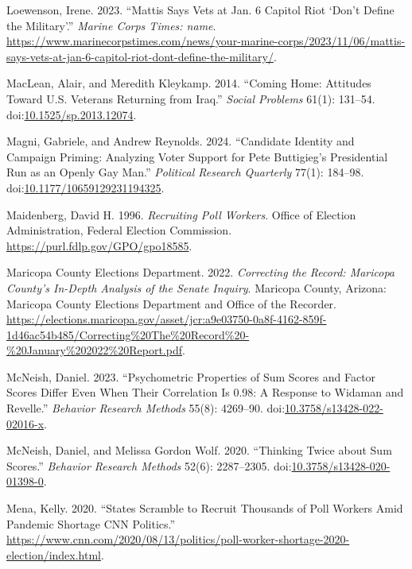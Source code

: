 \documentclass[
  12pt,
  letterpaper,
]{article}
\newlength{\cslhangindent}
\newenvironment{CSLReferences}[2] %
 {\begin{list}{}{%
  \setlength{\itemindent}{0pt}
  \setlength{\leftmargin}{0pt}
  \setlength{\parsep}{0pt}
  \ifodd #1
   \setlength{\leftmargin}{\cslhangindent}
   \setlength{\itemindent}{-1\cslhangindent}
  \fi
  \setlength{\itemsep}{#2\baselineskip}}}
 {\end{list}}
\begin{document}
\begin{CSLReferences}{1}{1}
Loewenson, Irene. 2023. {``Mattis Says Vets at {Jan}. 6 {Capitol} Riot
{`Don't Define the Military'}.''} \emph{Marine Corps Times: name}.
\url{https://www.marinecorpstimes.com/news/your-marine-corps/2023/11/06/mattis-says-vets-at-jan-6-capitol-riot-dont-define-the-military/}.

MacLean, Alair, and Meredith Kleykamp. 2014. {``Coming {Home}:
{Attitudes} Toward {U}.{S}. {Veterans Returning} from {Iraq}.''}
\emph{Social Problems} 61(1): 131--54.
doi:\href{https://doi.org/10.1525/sp.2013.12074}{10.1525/sp.2013.12074}.

Magni, Gabriele, and Andrew Reynolds. 2024. {``Candidate {Identity} and
{Campaign Priming}: {Analyzing Voter Support} for {Pete Buttigieg}'s
{Presidential Run} as an {Openly Gay Man}.''} \emph{Political Research
Quarterly} 77(1): 184--98.
doi:\href{https://doi.org/10.1177/10659129231194325}{10.1177/10659129231194325}.

Maidenberg, David H. 1996. \emph{Recruiting {Poll Workers}}. Office of
Election Administration, Federal Election Commission.
\url{https://purl.fdlp.gov/GPO/gpo18585}.

Maricopa County Elections Department. 2022. \emph{Correcting the
{Record}: {Maricopa County}'s {In-Depth Analysis} of the {Senate
Inquiry}}. Maricopa County, Arizona: {Maricopa County Elections
Department and Office of the Recorder}.
\url{https://elections.maricopa.gov/asset/jcr:a9e03750-0a8f-4162-859f-1d46ac54b485/Correcting\%20The\%20Record\%20-\%20January\%202022\%20Report.pdf}.

McNeish, Daniel. 2023. {``Psychometric Properties of Sum Scores and
Factor Scores Differ Even When Their Correlation Is 0.98: {A} Response
to {Widaman} and {Revelle}.''} \emph{Behavior Research Methods} 55(8):
4269--90.
doi:\href{https://doi.org/10.3758/s13428-022-02016-x}{10.3758/s13428-022-02016-x}.

McNeish, Daniel, and Melissa Gordon Wolf. 2020. {``Thinking Twice about
Sum Scores.''} \emph{Behavior Research Methods} 52(6): 2287--2305.
doi:\href{https://doi.org/10.3758/s13428-020-01398-0}{10.3758/s13428-020-01398-0}.

Mena, Kelly. 2020. {``States Scramble to Recruit Thousands of Poll
Workers Amid Pandemic Shortage \textbar{} {CNN Politics}.''}
\url{https://www.cnn.com/2020/08/13/politics/poll-worker-shortage-2020-election/index.html}.


\end{CSLReferences}
\end{document}
